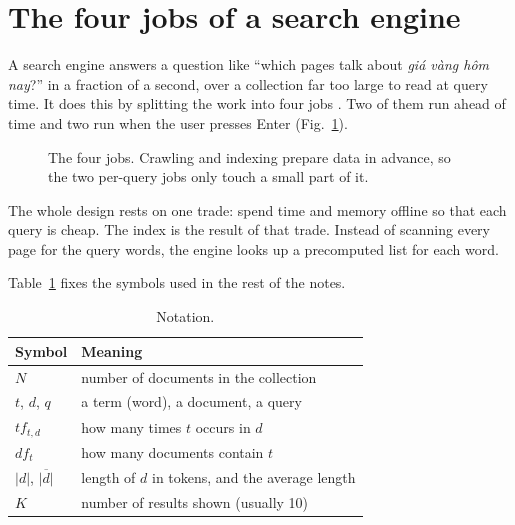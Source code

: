 \documentclass[9pt,twocolumn,a4paper]{extarticle}
\begin{document}
\section{The four jobs of a search engine}
\label{sec:overview}
A search engine answers a question like ``which pages talk about \emph{giá vàng hôm nay}?'' in a fraction of a second, over a collection far too large to read at query time. It does this by splitting the work into four jobs \cite{manning2008ir}. Two of them run ahead of time and two run when the user presses Enter (Fig.~\ref{fig:pipeline}).

\begin{figure}[H]
\centering
{}
\caption{The four jobs. Crawling and indexing prepare data in advance, so the two per-query jobs only touch a small part of it.}
\label{fig:pipeline}
\end{figure}

The whole design rests on one trade: spend time and memory offline so that each query is cheap. The index is the result of that trade. Instead of scanning every page for the query words, the engine looks up a precomputed list for each word.

Table~\ref{tab:notation} fixes the symbols used in the rest of the notes.

\begin{table}[H]
\centering
\caption{Notation.}
\label{tab:notation}
\footnotesize
\begin{tabular}{@{}lp{5.6cm}@{}}
\toprule
Symbol & Meaning \\
\midrule
$N$ & number of documents in the collection \\
$t$, $d$, $q$ & a term (word), a document, a query \\
$tf_{t,d}$ & how many times $t$ occurs in $d$ \\
$df_t$ & how many documents contain $t$ \\
$|d|$, $\overline{|d|}$ & length of $d$ in tokens, and the average length \\
$K$ & number of results shown (usually 10) \\
\bottomrule
\end{tabular}
\end{table}
\end{document}
